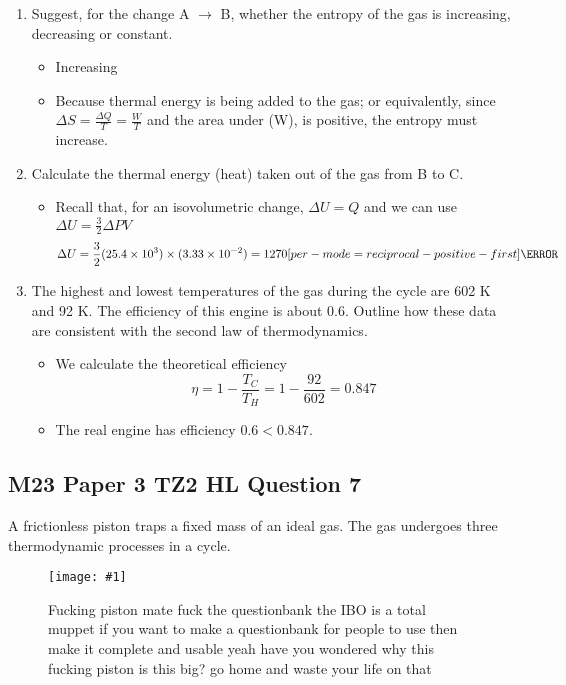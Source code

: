 \documentclass[a4paper,12pt]{article}
\let\oldsi\si
\renewcommand{\si}[1]{\oldsi[per-mode=reciprocal-positive-first]{#1}}
\newcommand{\img}[4]{\begin{center}
  \begin{figure}[H]
    \centering
    \texttt{[image: \#1]}
    \caption{#3}
    \label{fig:#4}
  \end{figure}
\end{center}}
\begin{document}
\begin{enumerate}[label=(\alph*)]
\begin{itemize}
        \end{itemize}
  \item Suggest, for the change A $\to$ B, whether the entropy of the gas is increasing,
        decreasing or constant.
        \begin{itemize}
          \item Increasing
          \item Because thermal energy is being added to the gas; or equivalently, since $\Delta S = \frac{\Delta Q}{T} = \frac{W}{T}$
                and the area under (W), is positive, the entropy must increase.
        \end{itemize}
  \item Calculate the thermal energy (heat) taken out of the gas from B to C.
        \begin{itemize}
          \item Recall that, for an isovolumetric change, $\Delta U = Q$ and we can use $\Delta U = \frac{3}{2}\Delta PV$
                \begin{align*}
                  \Delta U = \frac{3}{2} (25.4 \times 10^3) \times (3.33 \times 10^{-2}) = 1270 \si{\joule}
                \end{align*}
        \end{itemize}
  \item The highest and lowest temperatures of the gas during the cycle are 602 K and 92 K.
        The efficiency of this engine is about 0.6. Outline how these data are consistent with
        the second law of thermodynamics.
        \begin{itemize}
          \item We calculate the theoretical efficiency
                $$\eta = 1 - \frac{T_C}{T_H} = 1 - \frac{92}{602} = 0.847$$
          \item The real engine has efficiency $0.6 < 0.847$.
        \end{itemize}
\end{enumerate}

\pagebreak

\subsection{M23 Paper 3 TZ2 HL Question 7}

A frictionless piston traps a fixed mass of an ideal gas. The gas undergoes three thermodynamic processes in a cycle.

\img{ex/8.png}{0.5}{Fucking piston mate fuck the questionbank the IBO is a total muppet if you want to make a questionbank for people to use then make it complete and usable yeah have you wondered why this fucking piston is this big? go home and waste your life on that}{ex8}
\end{document}
